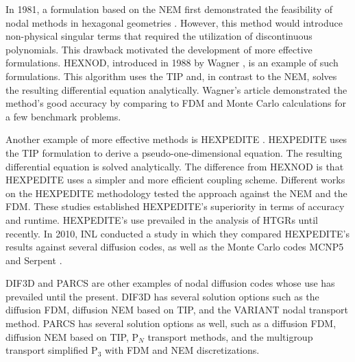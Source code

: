 In 1981, a formulation based on the \gls{NEM} first demonstrated the feasibility of nodal methods in hexagonal geometries \cite{duracz_nodal_1981}.
However, this method would introduce non-physical singular terms that required the utilization of discontinuous polynomials.
This drawback motivated the development of more effective formulations.
HEXNOD, introduced in 1988 by Wagner \cite{wagner_three-dimensional_1989}, is an example of such formulations.
This algorithm uses the \gls{TIP} and, in contrast to the \gls{NEM}, solves the resulting differential equation analytically.
Wagner's article demonstrated the method's good accuracy by comparing to \gls{FDM} and Monte Carlo calculations for a few benchmark problems.

Another example of more effective methods is HEXPEDITE \cite{fitzpatrick_hexpedite_1992}.
HEXPEDITE uses the \gls{TIP} formulation to derive a pseudo-one-dimensional equation.
The resulting differential equation is solved analytically.
The difference from HEXNOD is that HEXPEDITE uses a simpler and more efficient coupling scheme.
Different works \cite{fitzpatrick_hexpedite_1992}\cite{fitzpatrick_developments_1995} on the HEXPEDITE methodology tested the approach against the \gls{NEM} and the \gls{FDM}.
These studies established HEXPEDITE’s superiority in terms of accuracy and runtime.
HEXPEDITE's use prevailed in the analysis of \glspl{HTGR} until recently.
In 2010, \gls{INL} conducted a study \cite{ortensi_deterministic_2010-1} in which they compared HEXPEDITE's results against several diffusion codes, as well as the Monte Carlo codes MCNP5 \cite{rsicc_computer_code_collection_mcnp5_2003} and Serpent \cite{leppanen_serpent_2015}.

DIF3D \cite{lawrence_dif3d_1983} and PARCS \cite{downar_parcs_2004} are other examples of nodal diffusion codes whose use has prevailed until the present.
DIF3D has several solution options such as the diffusion \gls{FDM}, diffusion \gls{NEM} based on \gls{TIP}, and the VARIANT nodal transport method.
PARCS has several solution options as well, such as a diffusion \gls{FDM}, diffusion \gls{NEM} based on \gls{TIP}, P$_{N}$ transport methods, and the multigroup transport simplified P$_3$ with \gls{FDM} and \gls{NEM} discretizations.

